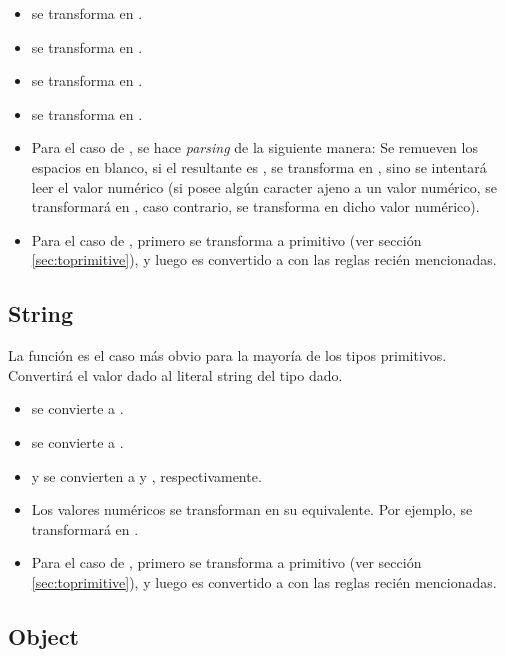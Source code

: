 \begin{itemize}
\item {} se transforma en .
\item {} se transforma en .
\item {} se transforma en .
\item {} se transforma en .
\item Para el caso de , se hace \textit{parsing} de la siguiente manera: Se remueven los espacios en blanco, si el  resultante es , se transforma en , sino se intentará leer el valor numérico (si posee algún caracter ajeno a un valor numérico, se transformará en , caso contrario, se transforma en dicho valor numérico).
\item Para el caso de , primero se transforma a primitivo (ver sección \ref{sec:toprimitive}), y luego es convertido a  con las reglas recién mencionadas.
\end{itemize}

\subsection{String}

La función  es el caso más obvio para la mayoría de los tipos primitivos. Convertirá el valor dado al literal string del tipo dado.

\begin{itemize}
\item {} se convierte a .
\item {} se convierte a .
\item {} y  se convierten a  y , respectivamente.
\item Los valores numéricos se transforman en su  equivalente. Por ejemplo,  se transformará en .
\item Para el caso de , primero se transforma a primitivo (ver sección \ref{sec:toprimitive}), y luego es convertido a  con las reglas recién mencionadas.
\end{itemize}

\subsection{Object}

